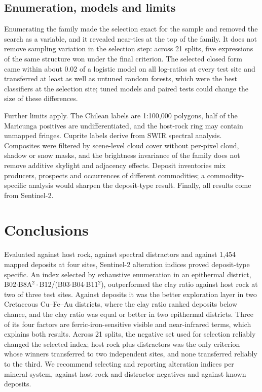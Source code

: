 \documentclass[pdflatex,sn-basic]{sn-jnl}
\begin{document}
\subsection{Enumeration, models and limits}

Enumerating the family made the selection exact for the sample and removed the search as a variable, and it revealed near-ties at the top of the family. It does not remove sampling variation in the selection step: across 21 splits, five expressions of the same structure won under the final criterion. The selected closed form came within about 0.02 of a logistic model on all log-ratios at every test site and transferred at least as well as untuned random forests, which were the best classifiers at the selection site; tuned models and paired tests could change the size of these differences.

Further limits apply. The Chilean labels are 1:100{,}000 polygons, half of the Maricunga positives are undifferentiated, and the host-rock ring may contain unmapped fringes. Cuprite labels derive from SWIR spectral analysis. Composites were filtered by scene-level cloud cover without per-pixel cloud, shadow or snow masks, and the brightness invariance of the family does not remove additive skylight and adjacency effects. Deposit inventories mix producers, prospects and occurrences of different commodities; a commodity-specific analysis would sharpen the deposit-type result. Finally, all results come from Sentinel-2.

\section{Conclusions}
\label{sec:conclusions}

Evaluated against host rock, against spectral distractors and against 1{,}454 mapped deposits at four sites, Sentinel-2 alteration indices proved deposit-type specific. An index selected by exhaustive enumeration in an epithermal district, B02$\cdot$B8A$^2\cdot$B12/(B03$\cdot$B04$\cdot$B11$^2$), outperformed the clay ratio against host rock at two of three test sites. Against deposits it was the better exploration layer in two Cretaceous Cu--Fe--Au districts, where the clay ratio ranked deposits below chance, and the clay ratio was equal or better in two epithermal districts. Three of its four factors are ferric-iron-sensitive visible and near-infrared terms, which explains both results. Across 21 splits, the negative set used for selection reliably changed the selected index; host rock plus distractors was the only criterion whose winners transferred to two independent sites, and none transferred reliably to the third. We recommend selecting and reporting alteration indices per mineral system, against host-rock and distractor negatives and against known deposits.
\end{document}
